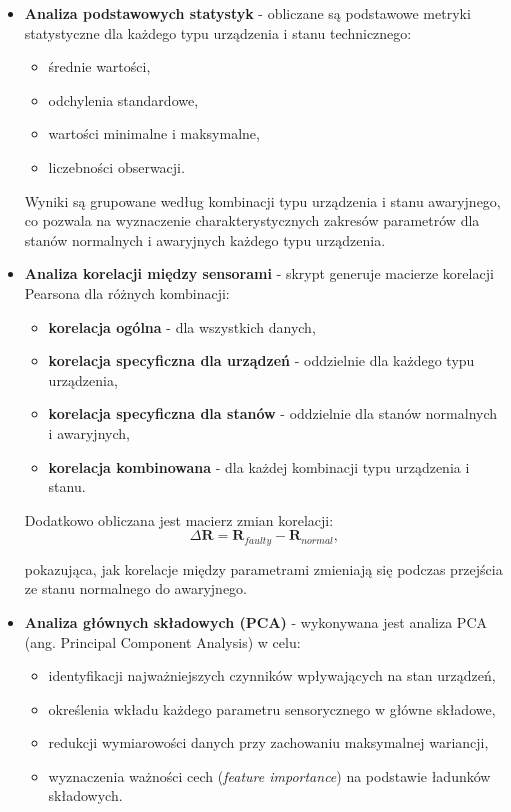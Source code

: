 \begin{itemize}

    \item \textbf{Analiza podstawowych statystyk} - obliczane są podstawowe metryki statystyczne dla każdego typu urządzenia i stanu technicznego:

\begin{itemize}
    \item średnie wartości,
    \item odchylenia standardowe,
    \item wartości minimalne i maksymalne,
    \item liczebności obserwacji.
\end{itemize}

Wyniki są grupowane według kombinacji typu urządzenia i stanu awaryjnego, co pozwala na wyznaczenie charakterystycznych zakresów parametrów dla stanów normalnych i awaryjnych każdego typu urządzenia.

    \item \textbf{Analiza korelacji między sensorami} - skrypt generuje macierze korelacji Pearsona \cite{pearson_correlation} dla różnych kombinacji:
    
\begin{itemize}
    \item \textbf{korelacja ogólna} - dla wszystkich danych,
    \item \textbf{korelacja specyficzna dla urządzeń} - oddzielnie dla każdego typu urządzenia,
    \item \textbf{korelacja specyficzna dla stanów} - oddzielnie dla stanów normalnych i awaryjnych,
    \item \textbf{korelacja kombinowana} - dla każdej kombinacji typu urządzenia i stanu.
\end{itemize}

Dodatkowo obliczana jest macierz zmian korelacji:
$$\Delta\mathbf{R} = \mathbf{R}_{faulty} - \mathbf{R}_{normal},$$ 

pokazująca, jak korelacje między parametrami zmieniają się podczas przejścia ze stanu normalnego do awaryjnego.

    \item \textbf{Analiza głównych składowych (PCA)} - wykonywana jest analiza PCA (ang. Principal Component Analysis) \cite{pca_jolliffe} w celu:
    
\begin{itemize}
    \item identyfikacji najważniejszych czynników wpływających na stan urządzeń,
    \item określenia wkładu każdego parametru sensorycznego w główne składowe,
    \item redukcji wymiarowości danych przy zachowaniu maksymalnej wariancji,
    \item wyznaczenia ważności cech (\textit{feature importance}) na podstawie ładunków składowych.
\end{itemize}

\end{itemize}

